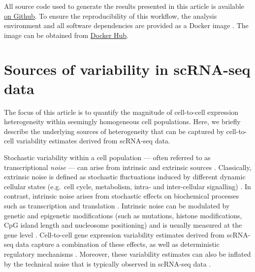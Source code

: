\documentclass[9pt,a4paper,]{extarticle}
\begin{document}
All source code used to generate the results presented in this article is
available \href{https://github.com/VallejosGroup/BASiCSWorkflow}{on Github}.
To ensure the
reproducibility of this workflow, the analysis environment and all software
dependencies are provided as a Docker image \citep{Boettiger2015}. The image
can be obtained from
\href{https://hub.docker.com/repository/docker/alanocallaghan/bocker}{Docker Hub}.

\hypertarget{sources-of-variability-in-scrna-seq-data}{%
\section{Sources of variability in scRNA-seq data}\label{sources-of-variability-in-scrna-seq-data}}

The focus of this article is to quantify the magnitude of cell-to-cell
expression heterogeneity within seemingly homogeneous cell populations.
Here, we briefly describe the underlying sources of heterogeneity that can be
captured by cell-to-cell variability estimates derived from scRNA-seq data.

Stochastic variability within a cell population --- often referred to as
transcriptional \emph{noise} --- can arise from intrinsic and extrinsic sources
\citep{Elowitz2002, Eling2019}.
Classically, extrinsic noise is defined as stochastic fluctuations induced by
different dynamic cellular states (e.g.~cell cycle, metabolism, intra- and
inter-cellular signalling)
\citep{Zopf2013, Iwamoto2016, Kiviet2014}.
In contrast, intrinsic noise arises from stochastic effects on biochemical
processes such as transcription and translation \citep{Elowitz2002}.
Intrinsic noise can be modulated by genetic and epigenetic modifications (such
as mutations, histone modifications, CpG island length and nucleosome
positioning) \citep{Eberwine2015, Faure2017, Morgan2018} and is usually measured
at the gene level \citep{Elowitz2002}.
Cell-to-cell gene expression variability estimates derived from scRNA-seq data
capture a combination of these effects, as well as deterministic regulatory
mechanisms \citep{Eling2019}.
Moreover, these variability estimates can also be inflated by the technical
noise that is typically observed in scRNA-seq data \citep{Brennecke2013}.
\end{document}
